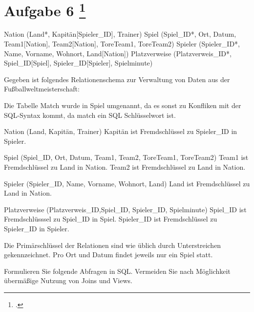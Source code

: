 \documentclass{lehramt-informatik-aufgabe}
\begin{document}
\section{Aufgabe 6
\footcite{66116:2021:03}}

\begin{liRelationenSchemaFormat}
Nation (Land*, Kapitän[Spieler_ID], Trainer)
Spiel (Spiel_ID*, Ort, Datum, Team1[Nation], Team2[Nation], ToreTeam1, ToreTeam2)
Spieler (Spieler_ID*, Name, Vorname, Wohnort, Land[Nation])
Platzverweise (Platzverweis_ID*, Spiel_ID[Spiel], Spieler_ID[Spieler], Spielminute)
\end{liRelationenSchemaFormat}

Gegeben ist folgendes Relationenschema zur Verwaltung von Daten aus der
Fußballweltmeisterschaft:

Die Tabelle Match wurde in Spiel umgenannt, da es sonst zu Konfliken mit
der SQL-Syntax kommt, da match ein SQL Schlüsselwort ist.

Nation (Land, Kapitän, Trainer)
Kapitän ist Fremdschlüssel zu Spieler\_ID in Spieler.

Spiel (Spiel\_ID, Ort, Datum, Team1, Team2, ToreTeam1, ToreTeam2)
Team1 ist Fremdschlüssel zu Land in Nation.
Team2 ist Fremdschlüssel zu Land in Nation.

Spieler (Spieler\_ID, Name, Vorname, Wohnort, Land)
Land ist Fremdschlüssel zu Land in Nation.

Platzverweise (Platzverweis\_ID,Spiel\_ID, Spieler\_ID, Spielminute)
Spiel\_ID ist Fremdschlüsssel zu Spiel\_ID in Spiel.
Spieler\_ID ist Fremdschlüssel zu Spieler\_ID in Spieler.

Die Primärschlüssel der Relationen sind wie üblich durch Unterstreichen
gekennzeichnet. Pro Ort und Datum findet jeweils nur ein Spiel statt.

Formulieren Sie folgende Abfragen in SQL. Vermeiden Sie nach Möglichkeit
übermäßige Nutzung von Joins und Views.
\end{document}
